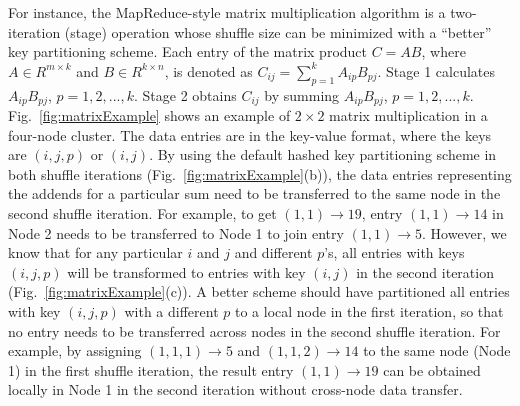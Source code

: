 \documentclass[10pt,journal,compsoc]{IEEEtran}
\begin{document}
For instance, the MapReduce-style matrix multiplication algorithm is a two-iteration
(stage) operation whose shuffle size can be minimized with a ``better''
key partitioning scheme.
Each entry of the matrix product $C=AB$, where $A \in R^{m \times k}$ and $B \in R^{k \times n}$, is denoted as $C_{ij}=\sum_{p=1}^k A_{ip}B_{pj}$. 
Stage 1 calculates $A_{ip}B_{pj}$, $p=1, 2, ..., k$. 
Stage 2 obtains $C_{ij}$ by summing $A_{ip}B_{pj}$, $p=1, 2, ..., k$.
Fig.~\ref{fig:matrixExample} shows an example of $2 \times 2$ matrix multiplication in a four-node cluster. 
The data entries are in the key-value format, where the keys are $(i,j,p)$ or $(i,j)$. 
By using the default hashed key partitioning scheme in both shuffle iterations
(Fig.~\ref{fig:matrixExample}(b)), the data entries representing the addends
for a particular sum need to be transferred to the same node in the
second shuffle iteration. %
For example, to get $(1,1) \rightarrow 19$, entry $(1,1)\rightarrow 14$ in Node 2 needs to be transferred to Node 1 to join entry $(1,1) \rightarrow 5$.
However, we know that for any particular $i$ and $j$ and different $p$'s, all entries with keys $(i,j,p)$ will be transformed to 
entries with key $(i,j)$ in
the second iteration (Fig.~\ref{fig:matrixExample}(c)).
A better scheme should have partitioned all entries with key $(i,j,p)$
with a different $p$ to a local node in the first iteration, so that 
no entry needs to be transferred across nodes in the second shuffle
iteration.
For example, by assigning $(1,1,1)\rightarrow 5$ and $(1,1,2)
\rightarrow 14$ to the same node (Node 1) in the first shuffle iteration,
the result entry $(1,1) \rightarrow 19$ can be obtained locally 
in Node 1 in the second iteration without cross-node data transfer.
\end{document}

